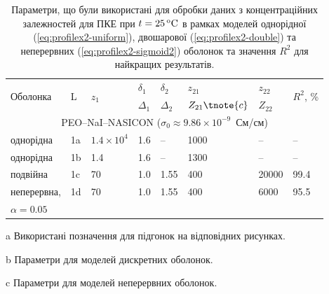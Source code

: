 \documentclass[14pt,twoside]{vakthesis}
\begin{document}
\begin{table}[!tb]
	\centering \caption{\label{tab:adjustable_params-11} Параметри, що були
		використані для обробки даних \cite{Przl1995,Wiec1994} з 
		концентраційних залежностей для ПКЕ при $t= 25\,\rm{^oC}$ в 
		рамках моделей однорідної (\ref{eq:profilex2-uniform}), двошарової (\ref{eq:profilex2-double})
		та неперервних (\ref{eq:profilex2-sigmoid2}) оболонок та значення $R^2$
		для найкращих результатів.}
	\begin{threeparttable}
		\begin{tabularx}{\textwidth}{|X|l|X|l|l|l|l|l|}
			\hline
			\multirow{2}{*}{Оболонка} &\multirow{2}{*}{L\tnote{a}} &   \multirow{2}{*}{${z}_1$} & $\delta_1$\tnote{b} & $\delta_2$\tnote{b} &  ${z}_{21}$\tnote{b} & ${z}_{22}$\tnote{b} &  \multirow{2}{*}{$R^2$, \%} \\
			&  & & $\Delta_1$\tnote{c}& $\Delta_2$\tnote{c}&${Z}_{21}\tnote{c}$&${Z}_{22}$\tnote{c}& \\
			\hline
			\multicolumn{8}{c}{PEO--NaI--NASICON ($\sigma_0 \approx 9.86\times 10^{-9}$~См/см)}\\
			\hline
			однорідна  &1a   & $1.4\times 10^4$ &1.6& -- &  1000& -- & --  \\
			однорідна                 &1b                                       &1.4             &1.6& -- &  1300& -- & -- \\
			подвійна                 &1c                                       &70              &1.0&1.55&  400  &  20000  &  99.4 \\
			неперервна, &1d                   &70              &1.0&1.55&  400 &  6000  &  95.5 \\
			$\alpha =0.05$ &    & & & &  & &  \\
			\hline
		\end{tabularx}
		\begin{tablenotes}
			\item[a] Використані позначення для підгонок на відповідних
			рисунках.
			\item[b] Параметри для моделей дискретних оболонок.
			\item[c] Параметри для моделей неперервних оболонок.
		\end{tablenotes}
	\end{threeparttable}
\end{table}
\end{document}
